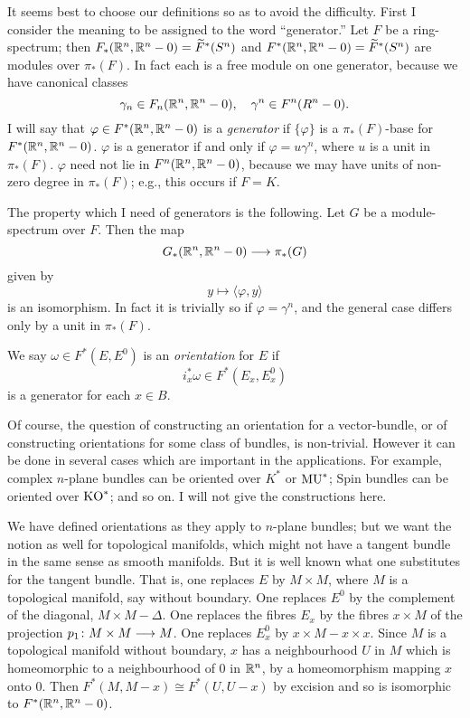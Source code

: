 \documentclass[../main]{subfiles}
\begin{document}
It seems best to choose our definitions so as to avoid the difficulty. First I consider the meaning to be assigned to the word ``generator.'' Let $F$ be a ring-spectrum; then $F_*(\mathbb{R}^n,\mathbb{R}^n-0) = \widetilde{F}^*(S^n)$ and $F^*(\mathbb{R}^n,\mathbb{R}^n-0) = \widetilde{F}^*(S^n)$ are modules over $\pi_*(F)$. In fact each is a free module on one generator, because we have canonical classes
\[\gamma_n \in F_n(\mathbb{R}^n,\mathbb{R}^n-0), \quad \gamma^n \in F^n(R^n-0).\]
I will say that $\varphi \in F^*(\mathbb{R}^n,\mathbb{R}^n-0)$ is a \emph{generator}  if $\{\varphi\}$ is a $\pi_*(F)$-base for $F^*(\mathbb{R}^n,\mathbb{R}^n-0)$. $\varphi$ is a generator if and only if $\varphi = u \gamma^n$, where $u$ is a unit in $\pi_*(F)$. $\varphi$ need not lie in $F^n(\mathbb{R}^n,\mathbb{R}^n-0)$, because we may have units of non-zero degree in $\pi_*(F)$; e.g., this occurs if $F=K$.

The property which I need of generators is the following. Let $G$ be a module-spectrum over $F$. Then the map \[G_*(\mathbb{R}^n,\mathbb{R}^n-0) \longrightarrow \pi_*(G)\]
given by 
\[y \mapsto  \langle \varphi , y \rangle\]
is an isomorphism. In fact it is trivially so if $\varphi = \gamma^n$, and the general case differs only by a unit in $\pi_*(F)$.

We say $\omega \in  F^*(E,E^0)$ is an \emph{orientation}  for $E$ if
\[i_x^* \omega \in F^*(E_x,E_x^0)\]
is a generator for each $x \in B$.

Of course, the question of constructing an orientation for a vector-bundle, or of constructing orientations for some class of bundles, is non-trivial. However it can be done in several cases which are important in the applications. For example, complex $n$-plane bundles can be oriented over $K^*$ or $\mathrm{MU}^*$; Spin bundles can be oriented over $\mathrm{KO}^*$; and so on. I will not give the constructions here.

We have defined orientations as they apply to $n$-plane bundles; but we want the notion as well for topological manifolds, which might not have a tangent bundle in the same sense as smooth manifolds. But it is well known what one substitutes for the tangent bundle. That is, one replaces $E$ by $M \times M$, where $M$ is a topological manifold, say without boundary. One replaces $E^0$ by the complement of the diagonal, $M \times M - \Delta$. One replaces the fibres $E_x$ by the fibres $x \times M$ of the projection $p_1 \colon M \times M \longrightarrow M$. One replaces $E^0_x$ by $x \times M - x \times x$. Since $M$ is a topological manifold without boundary, $x$ has a neighbourhood $U$ in $M$ which is homeomorphic to a neighbourhood of 0 in $\mathbb{R}^n$, by a homeomorphism mapping $x$ onto 0. Then $F^*(M,M-x) \cong F^*(U,U-x)$ by excision and so is isomorphic to $F^*(\mathbb{R}^n,\mathbb{R}^n - 0)$.
\end{document}
